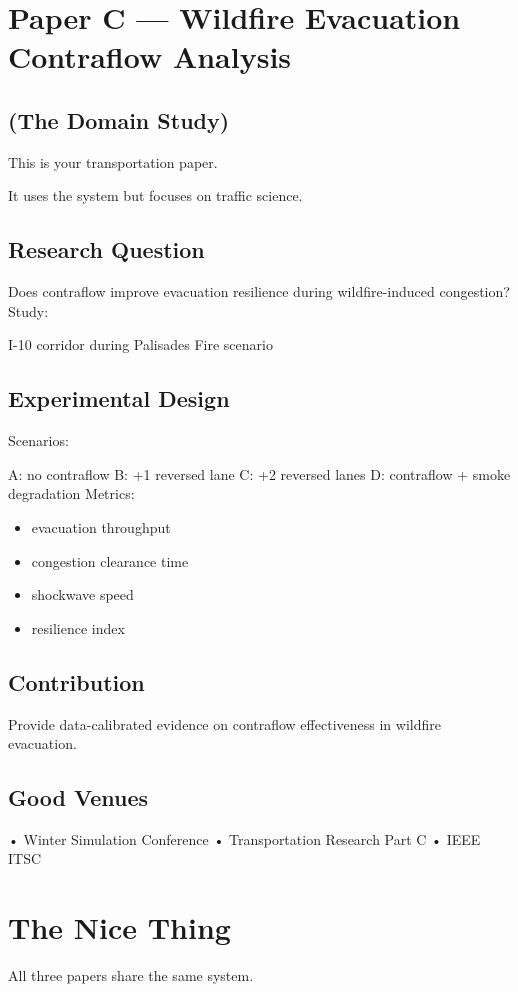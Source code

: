 \chapter*{Paper C — Wildfire Evacuation Contraflow Analysis}
\section*{(The Domain Study)}
This is your transportation paper.

It uses the system but focuses on traffic science.

\section*{Research Question}
Does contraflow improve evacuation resilience
during wildfire-induced congestion?
Study:

I-10 corridor during Palisades Fire scenario

\section*{Experimental Design}
Scenarios:

A: no contraflow
B: +1 reversed lane
C: +2 reversed lanes
D: contraflow + smoke degradation
Metrics:

\begin{itemize}
\item evacuation throughput


\item congestion clearance time


\item shockwave speed


\item resilience index


\end{itemize}
\section*{Contribution}
Provide data-calibrated evidence on contraflow effectiveness in wildfire evacuation.

\section*{Good Venues}
• Winter Simulation Conference
• Transportation Research Part C
• IEEE ITSC

\chapter*{The Nice Thing}
All three papers share the same system.

